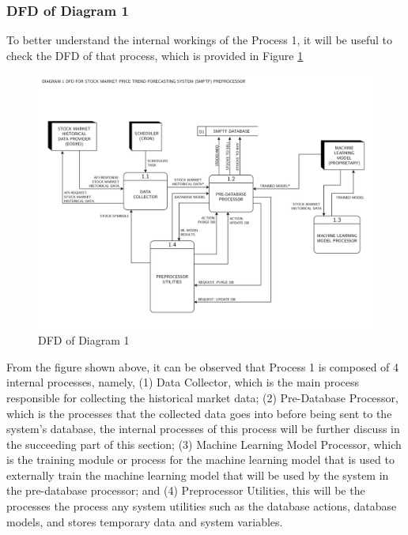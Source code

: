 \subsubsection{DFD of Diagram 1}
\label{subsubsec:dfd1}
To better understand the internal workings of the 
Process 1, it will be useful to check the DFD of that process, 
which is provided in Figure \ref{fig:dfd1}
\begin{figure}[ht]
    \centering
    \includegraphics[width=1\textwidth]{./assets/Data Flow Diagram-03.png}
    \caption{DFD of Diagram 1}
    \label{fig:dfd1}
\end{figure}
\FloatBarrier
\vspace{0.5cm}
From the figure shown above, it can be observed that Process 1 
is composed of 4 internal processes, namely, 
(1) Data Collector, which is the main process responsible 
for collecting the historical market data; 
(2) Pre-Database Processor, which is the processes that the collected 
data goes into before being sent to the system’s database, the 
internal processes of this process will be further discuss in the 
succeeding part of this section; 
(3) Machine Learning Model Processor, which is the training module or 
process for the machine learning model that is used to externally train 
the machine learning model that will be used by the system in the 
pre-database processor; and 
(4) Preprocessor Utilities, this will be the processes the process any 
system utilities such as the database actions, database models, and 
stores temporary data and system variables.

